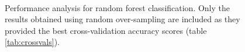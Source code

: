 \begin{figure}[H]
\begin{center}
     \\
\end{center}
\caption[caption]{Performance analysis for random forest classification. Only the
    results obtained using random over-sampling are included as they provided the
    best cross-validation accuracy scores (table \ref{tab:crossvals}).}
\label{fig:forest-performance}
\end{figure}

